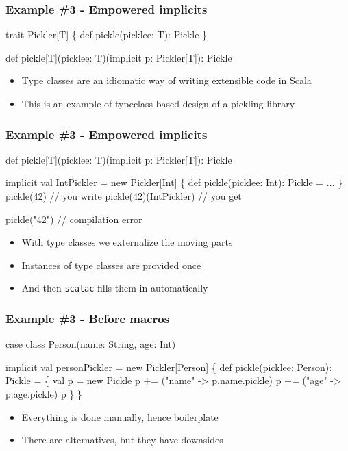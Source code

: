 \documentclass[svgnames,hyperref={bookmarks=false}]{beamer}
\begin{document}
\begin{frame}[fragile]
\frametitle{Example \#3 - Empowered implicits}

\begin{semiverbatim}
trait Pickler[T] \{
  def pickle(picklee: T): Pickle
\}

def pickle[T](picklee: T)(implicit p: Pickler[T]): Pickle

\end{semiverbatim}

\begin{itemize}
\item Type classes are an idiomatic way of writing extensible code in Scala
\item This is an example of typeclass-based design of a pickling library
\end{itemize}
\end{frame}

\begin{frame}[fragile]
\frametitle{Example \#3 - Empowered implicits}

\begin{semiverbatim}
def pickle[T](picklee: T)(implicit p: Pickler[T]): Pickle

implicit val IntPickler = new Pickler[Int] \{
  def pickle(picklee: Int): Pickle = ...
\}
pickle(42) // you write
pickle(42)(IntPickler) // you get

pickle("42") // compilation error

\end{semiverbatim}

\begin{itemize}
\item With type classes we externalize the moving parts
\item Instances of type classes are provided once
\item And then \texttt{scalac} fills them in automatically
\end{itemize}
\end{frame}

\begin{frame}[fragile]
\frametitle{Example \#3 - Before macros}

\begin{semiverbatim}
case class Person(name: String, age: Int)

implicit val personPickler = new Pickler[Person] \{
  def pickle(picklee: Person): Pickle = \{
    val p = new Pickle
    p += ("name" -> p.name.pickle)
    p += ("age" -> p.age.pickle)
    p
  \}
\}

\end{semiverbatim}

\begin{itemize}
\item Everything is done manually, hence boilerplate
\item There are alternatives, but they have downsides
\end{itemize}
\end{frame}
\end{document}
